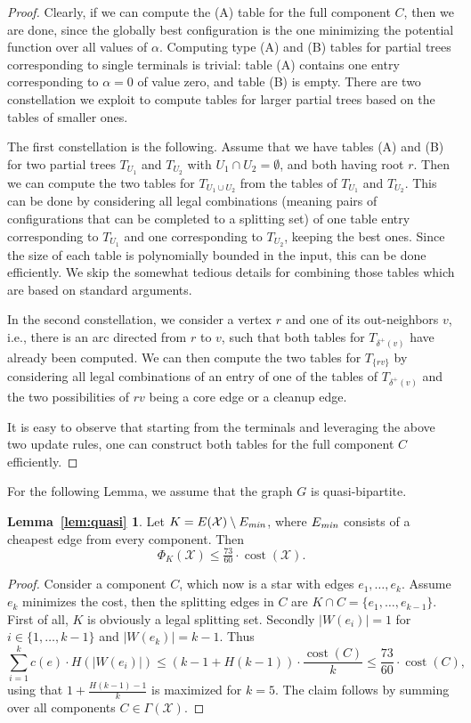\documentclass[11pt, letterpaper]{article}
\theoremstyle{definition}
\DeclareMathOperator{\cost}{cost}
\newcommand{\grphx}{\mathcal{X}}
\newcommand{\compof}[1]{\Gamma(#1)}
\newcommand{\compx}{\compof{\grphx}}
\newcommand{\core}{K}
\newcommand{\pot}[2]{\Phi_{#1}(#2)}
\newcommand{\Pot}{\pot{\core}{\grphx}}
\begin{document}
\begin{proof}
Clearly, if we can compute the (A) table for the full
component $C$, then we are done, since the globally best configuration
is the one minimizing the potential function over all values
of $\alpha$.
Computing type (A) and (B) tables for partial trees corresponding
to single terminals is trivial: table (A) contains one entry corresponding
to $\alpha=0$ of value zero, and table (B) is empty.
There are two constellation we exploit to compute tables for larger partial
trees based on the tables of smaller ones.

The first constellation is the following. Assume that we have tables (A)
and (B) for two partial trees $T_{U_1}$ and $T_{U_2}$ with $U_1\cap U_2=\emptyset$,
and both having root $r$. Then we can compute the two tables
for $T_{U_1\cup U_2}$ from the tables of $T_{U_1}$ and $T_{U_2}$.
This can be done by considering all legal combinations (meaning pairs of configurations that
can be completed to a splitting set)
of one table entry corresponding to $T_{U_1}$ and one corresponding to $T_{U_2}$,
keeping the best ones. Since the size of each table is polynomially bounded
in the input, this can be done efficiently.
We skip the somewhat tedious details for combining those tables which are
based on standard arguments.

In the second constellation, we consider a vertex $r$ and one of its
out-neighbors $v$, i.e., there is an arc directed from $r$ to $v$,
such that both tables for $T_{\delta^+(v)}$ have already been
computed. We can then compute the two tables for $T_{\{rv\}}$ by
considering all legal combinations of an entry of
one of the tables of $T_{\delta^+(v)}$ and the two
possibilities of $rv$ being a core edge or a cleanup edge.

It is easy to observe that starting from the terminals and leveraging
the above two update rules, one can construct both tables for
the full component $C$ efficiently.

\end{proof}

\medskip
For the following Lemma, we assume that the graph $G$ is quasi-bipartite. 
\newtheorem*{lemmaquasi}{Lemma~\ref{lem:quasi}}
\begin{lemmaquasi}
	Let $\core = E(\grphx) \setminus E_{\text{\it min}}$, where $E_{\text{\it min}}$ consists of a cheapest edge from every component. Then 
	\[ \Pot \leq \tfrac{73}{60}\cdot\cost(\grphx). \]
\end{lemmaquasi}
\begin{proof}
Consider a component $C$, which now is a star with edges $e_1,\ldots,e_k$. 
Assume $e_k$ minimizes the cost, then the splitting edges in $C$ are 
$K \cap C = \{ e_1,\ldots,e_{k-1}\}$. First of all, $K$ is
obviously a legal splitting set. Secondly $|W(e_i)| = 1$ for $i\in\{ 1,\ldots,k-1\}$ and $|W(e_k)| = k-1$.
Thus 
\[
\sum_{i=1}^k c(e) \cdot H(|W(e_i)| ) \leq  (k-1 + H(k-1)) \cdot \frac{\cost(C)}{k} \leq \frac{73}{60} \cdot \cost(C),
\] 
using that $1+\frac{H(k-1)-1}{k}$ is maximized for $k=5$. 
The claim follows by summing over all components $C \in \compx$.
\end{proof}
\end{document}
